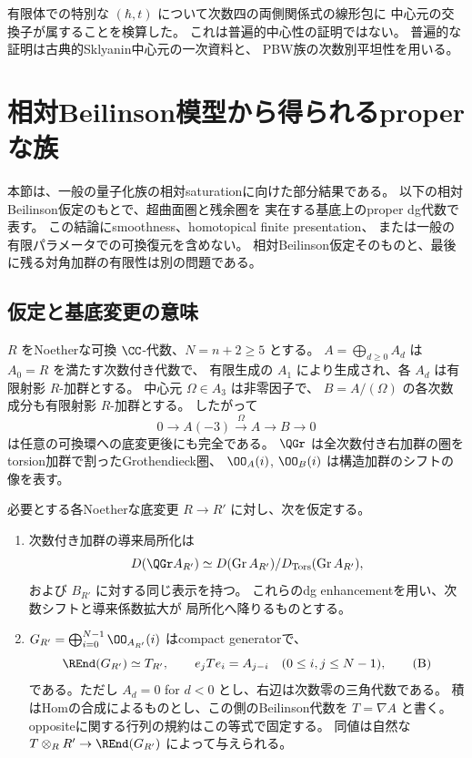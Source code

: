 有限体での特別な $(\hbar,t)$ について次数四の両側関係式の線形包に
中心元の交換子が属することを検算した。
これは普遍的中心性の証明ではない。
普遍的な証明は古典的Sklyanin中心元の一次資料と、
PBW族の次数別平坦性を用いる。

\section{相対Beilinson模型から得られるproperな族}
\label{sec:relative-proper-model}

本節は、一般の量子化族の相対saturationに向けた部分結果である。
以下の相対Beilinson仮定のもとで、超曲面圏と残余圏を
実在する基底上のproper dg代数で表す。
この結論にsmoothness、homotopical finite presentation、
または一般の有限パラメータでの可換復元を含めない。
相対Beilinson仮定そのものと、最後に残る対角加群の有限性は別の問題である。

\subsection{仮定と基底変更の意味}

\(R\) をNoetherな可換 \(\CC\)-代数、\(N=n+2\ge5\) とする。
\(A=\bigoplus_{d\ge0}A_d\) は \(A_0=R\) を満たす次数付き代数で、
有限生成の \(A_1\) により生成され、各 \(A_d\) は有限射影 \(R\)-加群とする。
中心元 \(\Omega\in A_3\) は非零因子で、
\(B=A/(\Omega)\) の各次数成分も有限射影 \(R\)-加群とする。
したがって
\[
 0\longrightarrow A(-3)\xrightarrow{\Omega}A
   \longrightarrow B\longrightarrow0
 \tag{Q}\label{eq:relative-quotient-sequence}
\]
は任意の可換環への底変更後にも完全である。
\(\QGr\) は全次数付き右加群の圏をtorsion加群で割ったGrothendieck圏、
\(\OO_A(i)\), \(\OO_B(i)\) は構造加群のシフトの像を表す。

\begin{definition}[本節の相対Beilinson仮定]\label{def:relative-beilinson-hyp}
 必要とする各Noetherな底変更 \(R\to R'\) に対し、次を仮定する。
 \begin{enumerate}[label=(RB\arabic*)]
 \item 次数付き加群の導来局所化は
 \[
 D(\QGr A_{R'})\simeq
 D(\operatorname{Gr}A_{R'})/
 D_{\operatorname{Tors}}(\operatorname{Gr}A_{R'}),
 \]
 および \(B_{R'}\) に対する同じ表示を持つ。
 これらのdg enhancementを用い、次数シフトと導来係数拡大が
 局所化へ降りるものとする。
 \item \(G_{R'}=\bigoplus_{i=0}^{N-1}\OO_{A_{R'}}(i)\) はcompact generatorで、
 \[
 \REnd(G_{R'})\simeq T_{R'},\qquad
 e_jTe_i=A_{j-i}\quad(0\le i,j\le N-1),
 \tag{B}\label{eq:relative-beilinson-algebra}
 \]
 である。ただし \(A_d=0\) for \(d<0\) とし、右辺は次数零の三角代数である。
 積はHomの合成によるものとし、この側のBeilinson代数を \(T=\nabla A\) と書く。
 oppositeに関する行列の規約はこの等式で固定する。
 同値は自然な \(T\otimes_RR'\to\REnd(G_{R'})\) によって与えられる。
 \end{enumerate}
\end{definition}

